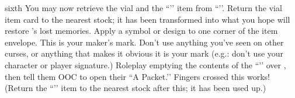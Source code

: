 \documentclass[notebook]{GL2020} %
\begin{document}
\begin{page}{sixth}
You may now retrieve the vial and the ``\iMemoryCure{}’’ item from ``\sSignM{}’’. Return the vial item card to the nearest stock; it has been transformed into what you hope will restore \cDisney{}’s lost memories. Apply a symbol or design to one corner of the item envelope. This is your maker’s mark. Don’t use anything you’ve seen on other curses, or anything that makes it obvious it is your mark (e.g.: don’t use your character or player signature.) Roleplay emptying the contents of the ``\iMemoryCure{}’’ over \cDisney{}, then tell them OOC to open their ``A Packet.’’ Fingers crossed this works! (Return the ``\iMemoryCure{}’’ item to the nearest stock after this; it has been used up.)

\end{page}

\endnotebook
\end{document}
